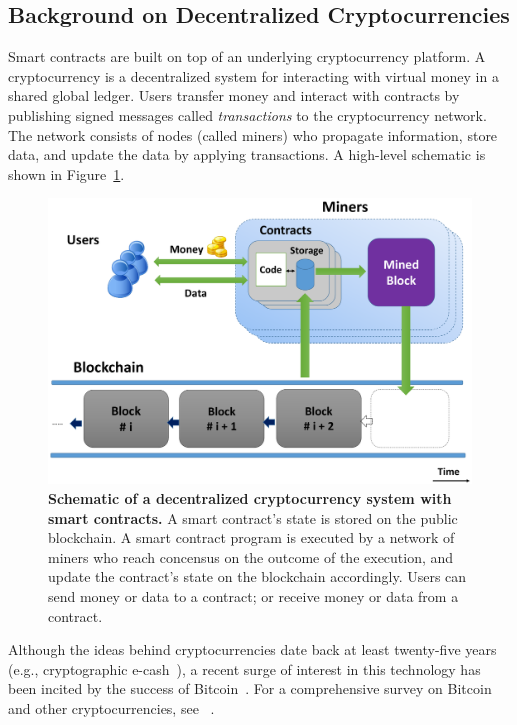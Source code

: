 \documentclass[10pt,twocolumn,letterpaper]{article}
\begin{document}
\subsection{Background on Decentralized Cryptocurrencies}
Smart contracts are built on top of an underlying cryptocurrency platform. A cryptocurrency is a decentralized system for interacting with virtual money in a shared global ledger. Users transfer money and interact with contracts by publishing signed messages called \emph{transactions} to the cryptocurrency network. The network consists of nodes (called miners) who propagate information, store data, and update the data by applying transactions. A high-level schematic is shown in Figure~\ref{fig:schematic}.
\begin{figure}[t]
\centering
\includegraphics[width=\columnwidth]{overview_figure}
\caption{{\bf Schematic of a decentralized cryptocurrency system 
with smart contracts.}
A smart contract's state is stored on the public blockchain.
A smart contract program is executed by a 
network of miners who reach concensus on the
outcome of the execution, and update the contract's state 
on the blockchain accordingly.
Users can send money or data to a contract;
or receive money or data from a contract.
}
\label{fig:schematic}
\end{figure}

Although the ideas behind cryptocurrencies date back at least twenty-five years (e.g., cryptographic e-cash~\cite{chaum-ecash}), a recent surge of interest in this technology has been incited by the success of Bitcoin~\cite{bitcoin}. For a comprehensive survey on Bitcoin and other cryptocurrencies, see ~\cite{researchperspectives,bittertobetter}.
\end{document}
